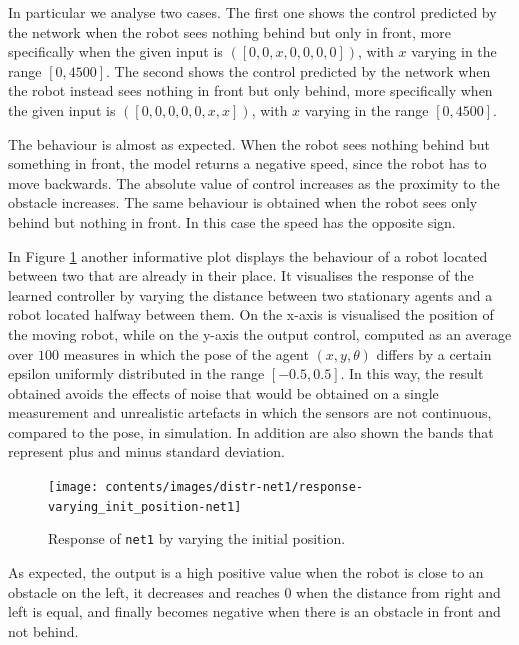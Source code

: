 In particular we analyse two cases. The first one shows the control predicted by 
the network when the robot sees nothing behind but only in front, more 
specifically when the given input is  $([0, 0, x, 0, 0, 0, 0])$, with $x$ varying in the 
range $[0, 4500]$.
The second shows the control predicted by the network when the robot instead 
sees nothing in front but only behind, more specifically when the given input is  
$([0, 0, 0, 0, 0,x , x])$, with $x$ varying in the range $[0, 4500]$.

The behaviour is almost as expected. When the robot sees nothing behind but 
something in front, the model returns a negative speed, since the robot has to 
move backwards. 
The absolute value of control increases as the proximity to the obstacle increases.
The same behaviour is obtained when the robot sees only behind but nothing in 
front. In this case the speed has the opposite sign.

In Figure \ref{fig:net1responseposition} another informative plot displays the 
behaviour of a robot located between two that are already in their place.
It visualises the response of the learned controller by varying the distance 
between two stationary agents and a robot located halfway between them.
On the x-axis is visualised the position of the moving robot, while on the y-axis 
the output control, computed as an average over $100$ measures in which the 
pose of the agent $(x, y, \theta)$ differs by a certain epsilon uniformly distributed 
in the range $[-0.5, 0.5]$. In this way, the result obtained avoids the effects of 
noise that would be obtained on a single measurement and unrealistic artefacts in 
which the sensors are not continuous, compared to the pose, in simulation. In 
addition are also shown the bands that represent plus and minus standard 
deviation.
\begin{figure}[!htb]
	\centering
	\texttt{[image: contents/images/distr-net1/response-varying\_init\_position-net1]}%
	\caption{Response of \texttt{net1} by varying the initial position.}
	\label{fig:net1responseposition}
\end{figure}

As expected, the output is a high positive value when the robot is close to an 
obstacle on the left, it decreases and reaches $0$ when the distance from right 
and left is equal, and finally becomes negative when there is an obstacle in front 
and not behind.


